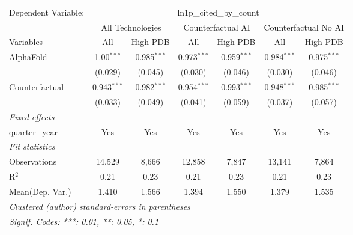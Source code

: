\begingroup
\centering
\begin{tabular}{lcccccc}
   \tabularnewline \midrule \midrule
   Dependent Variable: & \multicolumn{6}{c}{ln1p\_cited\_by\_count}\\
 & \multicolumn{2}{c}{All Technologies} & \multicolumn{2}{c}{Counterfactual AI} & \multicolumn{2}{c}{Counterfactual No AI} \\
\cmidrule(lr){1-1}\cmidrule(lr){2-3} \cmidrule(lr){4-5} \cmidrule(lr){6-7}
Variables & \multicolumn{1}{c}{All} & \multicolumn{1}{c}{High PDB} & \multicolumn{1}{c}{All} & \multicolumn{1}{c}{High PDB} & \multicolumn{1}{c}{All} & \multicolumn{1}{c}{High PDB} \\
\cmidrule(lr){1-1}\cmidrule(lr){2-2} \cmidrule(lr){3-3} \cmidrule(lr){4-4} \cmidrule(lr){5-5} \cmidrule(lr){6-6} \cmidrule(lr){7-7}
   AlphaFold      & 1.00$^{***}$  & 0.985$^{***}$ & 0.973$^{***}$ & 0.959$^{***}$ & 0.984$^{***}$ & 0.975$^{***}$\\   
                  & (0.029)       & (0.045)       & (0.030)       & (0.046)       & (0.030)       & (0.046)\\   
   Counterfactual & 0.943$^{***}$ & 0.982$^{***}$ & 0.954$^{***}$ & 0.993$^{***}$ & 0.948$^{***}$ & 0.985$^{***}$\\   
                  & (0.033)       & (0.049)       & (0.041)       & (0.059)       & (0.037)       & (0.057)\\   
   \midrule
   \emph{Fixed-effects}\\
   quarter\_year  & Yes           & Yes           & Yes           & Yes           & Yes           & Yes\\  
   \midrule
   \emph{Fit statistics}\\
   Observations   & 14,529        & 8,666         & 12,858        & 7,847         & 13,141        & 7,864\\  
   R$^2$          & 0.21          & 0.23          & 0.21          & 0.23          & 0.21          & 0.23\\  
Mean(Dep. Var.) & 1.410 & 1.566 & 1.394 & 1.550 & 1.379 & 1.535 \\
   \midrule \midrule
   \multicolumn{7}{l}{\emph{Clustered (author) standard-errors in parentheses}}\\
   \multicolumn{7}{l}{\emph{Signif. Codes: ***: 0.01, **: 0.05, *: 0.1}}\\
\end{tabular}
\par\endgroup
